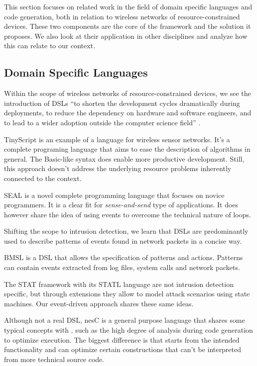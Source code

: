 \documentclass[conference]{IEEEtran}
\begin{document}
This section focuses on related work in the field of domain specific languages
and code generation, both in relation to wireless networks of
resource-constrained devices. These two components are the core of the \NAME
framework and the solution it proposes. We also look at their application in
other disciplines and analyze how this can relate to our context.

\subsection{Domain Specific Languages}

Within the scope of wireless networks of resource-constrained devices, we see
the introduction of DSLs \enquote{to shorten the development cycles
dramatically during deployments, to reduce the dependency on hardware and
software engineers, and to lead to a wider adoption outside the computer
science field} \cite{sadilek2008domain}.

TinyScript \cite{levis2004tinyscript} is an example of a language for wireless
sensor networks. It's a complete programing language that aims to ease the
description of algorithms in general. The Basic-like syntax does enable more
productive development. Still, this approach doesn't address the underlying
resource problems inherently connected to the context.

SEAL \cite{elsts2013seal} is a novel complete programming language that focuses
on novice programmers. It is a clear fit for \emph{sense-and-send} type of
applications. It does however share the idea of using events to overcome the
technical nature of loops.

Shifting the scope to intrusion detection, we learn that DSLs are predominantly
used to describe patterns of events found in network
packets \cite{sekar1999high,roesch1999snort} in a concise way.

BMSL \cite{uppuluri2001experiences} is a DSL that allows the specification of
patterns and actions. Patterns can contain events extracted from log files,
system calls and network packets.

The STAT framework with its STATL language
\cite{eckmann2002statl,vigna2003designing} are not intrusion detection
specific, but through extensions they allow to model attack scenarios using
state machines. Our event-driven approach shares these same ideas.

Although not a real DSL, nesC \cite{gay2003nesc} is a general purpose language
that shares some typical concepts with \NAME, such as the high degree of
analysis during code generation to optimize execution. The biggest difference
is that \NAME starts from the intended functionality and can optimize certain
constructions that can't be interpreted from more technical source code.
\end{document}
